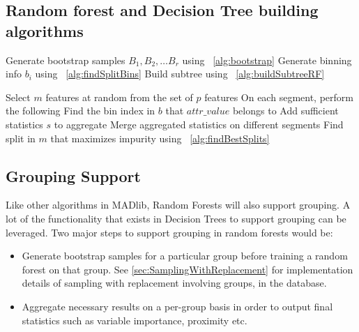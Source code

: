 \subsection{Random forest and Decision Tree building algorithms}
\begin{algorithm}[BuildRandomForest$(D^*)$] \label{alg:buildRandomForest}
\begin{algorithmic}[1]
   \State Generate bootstrap samples $B_{1}, B_{2}, \dots B_{r}$ 
   using ~\ref{alg:bootstrap}
       \State Generate binning info $b_{i}$ using ~\ref{alg:findSplitBins}
       \State Build subtree using ~\ref{alg:buildSubtreeRF}
   \EndFor
   \end{algorithmic}
\end{algorithm}

\begin{algorithm}[buildSubtreeRandomForest$(D^*, M, n_l, B)$] \label{alg:buildSubtreeRF}
\begin{algorithmic}[1]
   \State Select $m$ features at random from the set of $p$ features
   \State On each segment, perform the following 
            \State Find the bin index in $b$ that $attr\_value$ belongs to
            \State Add sufficient statistics $s$ to aggregate
        \EndFor
    \EndFor
    \State Merge aggregated statistics on different segments 
    \State Find split in $m$ that maximizes impurity using ~\ref{alg:findBestSplits}
\end{algorithmic}
\end{algorithm}

\subsection{Grouping Support}
Like other algorithms in MADlib, Random Forests will also support grouping. A lot of the 
functionality that exists in Decision Trees to support grouping can be leveraged. 
Two major steps to support grouping in random forests would be:
\begin{itemize}
    \item Generate bootstrap samples for a particular group before training a random forest 
    on that group. See \ref{sec:SamplingWithReplacement} for implementation details of 
    sampling with replacement involving groups, in the database. 
    \item Aggregate necessary results on a per-group basis in order to output final statistics
    such as variable importance, proximity etc.
\end{itemize}


